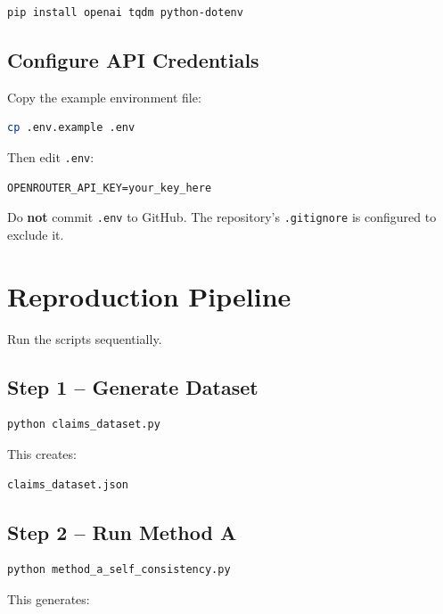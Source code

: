 \documentclass[11pt,a4paper]{article}
\begin{document}
\begin{lstlisting}[language=bash]
pip install openai tqdm python-dotenv
\end{lstlisting}

\subsection{Configure API Credentials}

Copy the example environment file:

\begin{lstlisting}[language=bash]
cp .env.example .env
\end{lstlisting}

Then edit \texttt{.env}:

\begin{lstlisting}
OPENROUTER_API_KEY=your_key_here
\end{lstlisting}

Do \textbf{not} commit \texttt{.env} to GitHub. The repository's \texttt{.gitignore} is configured to exclude it.


\section{Reproduction Pipeline}

Run the scripts sequentially.

\subsection{Step 1 -- Generate Dataset}

\begin{lstlisting}[language=bash]
python claims_dataset.py
\end{lstlisting}

This creates:

\begin{lstlisting}
claims_dataset.json
\end{lstlisting}

\subsection{Step 2 -- Run Method A}

\begin{lstlisting}[language=bash]
python method_a_self_consistency.py
\end{lstlisting}

This generates:
\end{document}
